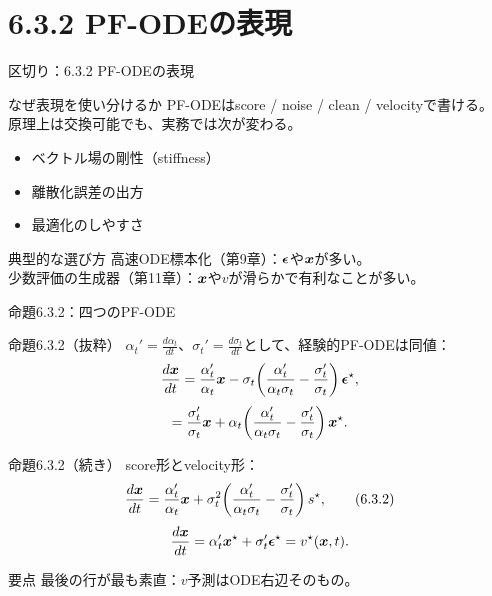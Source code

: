 \section{6.3.2 PF-ODEの表現}
\asmain
\begin{frame}{区切り：6.3.2 PF-ODEの表現}
    \tableofcontents[currentsection]
\end{frame}
\asmain
\begin{frame}{なぜ表現を使い分けるか}
    PF-ODEはscore / noise / clean / velocityで書ける。\\
    原理上は交換可能でも、実務では次が変わる。
    \begin{itemize}
        \item ベクトル場の剛性（stiffness）
        \item 離散化誤差の出方
        \item 最適化のしやすさ
    \end{itemize}
    \begin{exampleblock}{典型的な選び方}
        高速ODE標本化（第9章）：$\bm{\epsilon}$や$\bm{x}$が多い。\\
        少数評価の生成器（第11章）：$\bm{x}$や$v$が滑らかで有利なことが多い。
    \end{exampleblock}
\end{frame}
\asmain
\begin{frame}{命題6.3.2：四つのPF-ODE}
    \begin{block}{命題6.3.2（抜粋）}
        $\alpha_t'=\frac{d\alpha_t}{dt}$、$\sigma_t'=\frac{d\sigma_t}{dt}$として、経験的PF-ODEは同値：
        \[
            \frac{d\bm{x}}{dt}
            =
            \frac{\alpha_t'}{\alpha_t}\bm{x}
            -
            \sigma_t\!\left(\frac{\alpha_t'}{\alpha_t\sigma_t}-\frac{\sigma_t'}{\sigma_t}\right)\bm{\epsilon}^\star,
        \]
        \[
            =
            \frac{\sigma_t'}{\sigma_t}\bm{x}
            +
            \alpha_t\!\left(\frac{\alpha_t'}{\alpha_t\sigma_t}-\frac{\sigma_t'}{\sigma_t}\right)\bm{x}^\star.
        \]
    \end{block}
\end{frame}
\asmain
\begin{frame}{命題6.3.2（続き）}
    score形とvelocity形：
    \[
        \frac{d\bm{x}}{dt}
        =
        \frac{\alpha_t'}{\alpha_t}\bm{x}
        +
        \sigma_t^{2}\!\left(\frac{\alpha_t'}{\alpha_t\sigma_t}-\frac{\sigma_t'}{\sigma_t}\right)s^\star,
        \tag{6.3.2}
    \]
    \[
        \frac{d\bm{x}}{dt}
        =
        \alpha_t'\bm{x}^\star + \sigma_t'\bm{\epsilon}^\star
        =
        v^\star(\bm{x},t).
    \]
    \begin{block}{要点}
        最後の行が最も素直：$v$予測はODE右辺そのもの。
    \end{block}
\end{frame}
